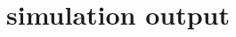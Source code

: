 \documentclass[11pt,compress,xcolor=x11names,UTF8]{beamer}
\begin{document}
\section{simulation output }

\end{document}
